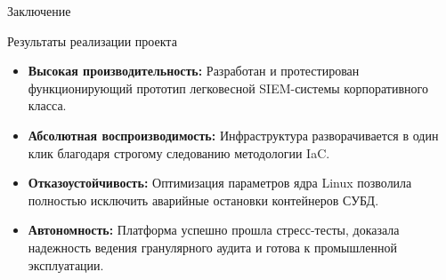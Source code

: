 \documentclass[10pt,pdftex,aspectratio=169]{beamer}
\begin{document}
\begin{frame}{Заключение}
    \begin{block}{Результаты реализации проекта}
        \begin{itemize}
            \item \textbf{Высокая производительность:} Разработан и протестирован функционирующий прототип легковесной SIEM-системы корпоративного класса.
            \item \textbf{Абсолютная воспроизводимость:} Инфраструктура разворачивается в один клик благодаря строгому следованию методологии IaC.
            \item \textbf{Отказоустойчивость:} Оптимизация параметров ядра Linux позволила полностью исключить аварийные остановки контейнеров СУБД.
            \item \textbf{Автономность:} Платформа успешно прошла стресс-тесты, доказала надежность ведения гранулярного аудита и готова к промышленной эксплуатации.
        \end{itemize}
    \end{block}
\end{frame}
\end{document}
